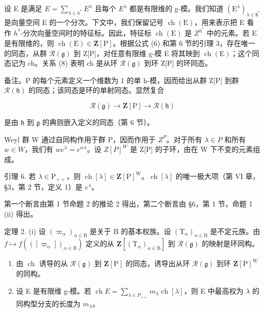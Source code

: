 设 E 是满足 \(E = \sum_{\lambda \in h^{*}} E^{\lambda}\) 且每个 \(E^{\lambda}\) 都是有限维的 g-模。我们知道 \((\mathrm{E}^{\lambda})_{\lambda \in \mathfrak{h}^{*}}\) 是向量空间 E 的一个分次。下文中，我们保留记号 \(\operatorname{ch}(\mathrm{E})\)，用来表示把 E 看作 \(h^{*}\)-分次向量空间时的特征标。因此，特征标 \(\operatorname{ch}(\mathrm{E})\) 是 \(Z^{h^{*}}\) 中的元素。若 E 是有限维的，则 \(\operatorname{ch}(\mathrm{E}) \in \mathbf{Z}[\mathrm{P}]\)。根据公式 (6) 和第 6 节的引理 3，存在唯一的同态，从群 \(\mathcal{R}(\mathfrak{g})\) 到 Z{[}P{]}，对任意有限维 g-模 E 将其映到 \(\operatorname{ch}(\mathrm{E})\)；这个同态记为 ch。关系 (8) 表明 ch 是从环 \(\mathcal{R}(\mathfrak{g})\) 到环 Z{[}P{]} 的环同态。

备注。P 的每个元素定义一个维数为 1 的单 h-模，因而给出从群 Z{[}P{]} 到群 \(\mathcal{R}(\mathfrak{h})\) 的同态；该同态是环的单射同态。显然复合

\[
\mathcal {R} (\mathfrak {g}) \longrightarrow \mathbf {Z} [ \mathrm{P} ] \longrightarrow \mathcal {R} (\mathfrak {h})
\]

是由 \(\mathfrak{h}\) 到 \(\mathfrak{g}\) 的典则嵌入定义的同态（第 6 节）。

Weyl 群 W 通过自同构作用于群 P，因而作用于 \(Z^{P}\)。对于所有 \(\lambda \in P\) 和所有 \(w \in W\)，我们有 \(we^{\lambda} = e^{w\lambda}\)。设 \(Z[P]^{W}\) 是 Z{[}P{]} 的子环，由在 W 下不变的元素组成。

引理 6. 若 \(\lambda \in \mathrm{P}_{++}\)，则 \(\operatorname{ch}[\lambda] \in \mathbf{Z}[\mathrm{P}]^{\mathrm{W}}\)。\(\operatorname{ch}[\lambda]\) 的唯一极大项（第 VI 章，§3，第 2 节，定义 1）是 \(e^{\lambda}\)。

第一个断言由第 1 节命题 2 的推论 2 得出，第二个断言由 §6，第 1 节，命题 1 (ii) 得出。

定理 2. (i) 设 \((\varpi_{\alpha})_{\alpha \in \mathrm{B}}\) 是关于 B 的基本权族。设 \((\mathrm{T}_{\alpha})_{\alpha \in \mathrm{B}}\) 是不定元族。由 \(f\mapsto f(\left([ \varpi_{\alpha} ]\right)_{\alpha \in \mathrm{B}})\) 定义的从 \(\mathbf{Z}[(\mathrm{T}_{\alpha})_{\alpha \in \mathrm{B}}]\) 到 \(\mathcal{R}(\mathfrak{g})\) 的映射是环同构。

\begin{enumerate}
\def\labelenumi{(\roman{enumi})}
\setcounter{enumi}{1}
\item
  由 \(\operatorname{ch}\) 诱导的从 \(\mathcal{R}(\mathfrak{g})\) 到 \(\mathbf{Z}[\mathrm{P}]\) 的同态，诱导出从环 \(\mathcal{R}(\mathfrak{g})\) 到环 \(\mathbf{Z}[\mathrm{P}]^{\mathrm{W}}\) 的同构。
\item
  设 E 是有限维 g-模。若 \(\operatorname{ch} E = \sum_{\lambda \in P_{++}} m_{\lambda} \operatorname{ch}[\lambda]\)，则 E 中最高权为 \(\lambda\) 的同构型分支的长度为 \(m_{\lambda}\)。
\end{enumerate}

